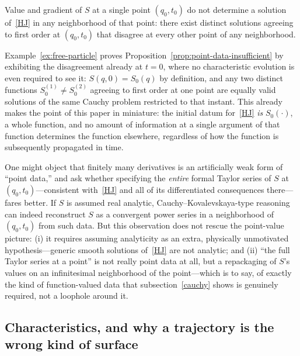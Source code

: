 \begin{proposition}
\label{prop:point-data-insufficient}
Value and gradient of $S$ at a single point $(q_0,t_0)$ do not determine a
    solution of~\eqref{HJ} in any neighborhood of that point: there exist
    distinct solutions agreeing to first order at $(q_0,t_0)$ that disagree at
    every other point of any neighborhood.
\end{proposition}

Example~\ref{ex:free-particle} proves
Proposition~\ref{prop:point-data-insufficient} by exhibiting the disagreement
already at $t=0$, where no characteristic evolution is even required to see it:
$S(q,0)=S_0(q)$ by definition, and any two distinct functions $S_0^{(1)}\neq
S_0^{(2)}$ agreeing to first order at one point are equally valid solutions of
the same Cauchy problem restricted to that instant. This already makes the
point of this paper in miniature: the initial datum for~\eqref{HJ} \emph{is}
$S_0(\cdot)$, a whole function, and no amount of information at a single
argument of that function determines the function elsewhere, regardless of how
the function is subsequently propagated in time.

\begin{remark}
One might object that finitely many derivatives is an artificially weak form of
    ``point data,'' and ask whether specifying the \emph{entire} formal Taylor
    series of $S$ at $(q_0,t_0)$---consistent with~\eqref{HJ} and all of its
    differentiated consequences there---fares better. If $S$ is assumed real
    analytic, Cauchy--Kovalevskaya-type reasoning can indeed reconstruct $S$ as
    a convergent power series in a neighborhood of $(q_0,t_0)$ from such data.
    But this observation does not rescue the point-value picture: (i) it
    requires assuming analyticity as an extra, physically unmotivated
    hypothesis---generic smooth solutions of~\eqref{HJ} are not analytic; and
    (ii) ``the full Taylor series at a point'' is not really point data at all,
    but a repackaging of $S$'s values on an infinitesimal neighborhood of the
    point---which is to say, of exactly the kind of function-valued data that
    subsection~\ref{cauchy} shows is genuinely required, not a loophole around
    it.
\end{remark}

\subsection{Characteristics, and why a trajectory is the wrong kind of surface}
\label{characteristics}

